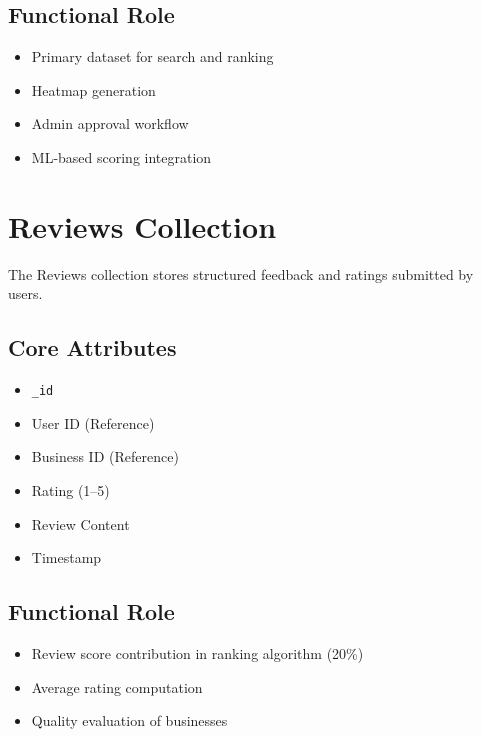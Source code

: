 \documentclass[12pt,a4paper]{report}
\begin{document}
\subsection*{Functional Role}

\begin{itemize}

\item Primary dataset for search and ranking

\item Heatmap generation

\item Admin approval workflow

\item ML-based scoring integration

\end{itemize}

\section{Reviews Collection}

The Reviews collection stores structured feedback and ratings submitted by users.

\subsection*{Core Attributes}

\begin{itemize}

\item \texttt{\_id}

\item User ID (Reference)

\item Business ID (Reference)

\item Rating (1--5)

\item Review Content

\item Timestamp

\end{itemize}

\subsection*{Functional Role}

\begin{itemize}

\item Review score contribution in ranking algorithm (20\%)

\item Average rating computation

\item Quality evaluation of businesses

\end{itemize}
\end{document}
